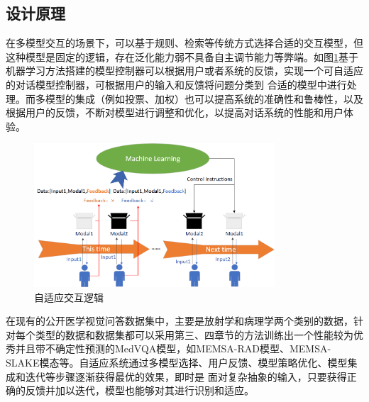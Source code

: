 \subsection{设计原理}
在多模型交互的场景下，可以基于规则、检索等传统方式选择合适的交互模型，但这种模型是固定的逻辑，存在泛化能力弱不具备自主调节能力等弊端。如图\ref{comu_logit}基于机器学习方法搭建的模型控制器可以根据用户或者系统的反馈，实现一个可自适应的对话模型控制器，可根据用户的输入和反馈将问题分类到
合适的模型中进行处理。而多模型的集成（例如投票、加权）也可以提高系统的准确性和鲁棒性，以及根据用户的反馈，不断对模型进行调整和优化，以提高对话系统的性能和用户体验。

\begin{figure}[htbp]
	\centering	
	\includegraphics[width=0.8\textwidth]{Fig/myfig/chapter5/comu_logit.png}  %
	\caption{\label{comu_logit}自适应交互逻辑} 
\end{figure}

在现有的公开医学视觉问答数据集中，主要是放射学和病理学两个类别的数据，针对每个类型的数据和数据集都可以采用第三、四章节的方法训练出一个性能较为优秀并且带不确定性预测的MedVQA模型，如MEMSA-RAD模型、MEMSA-SLAKE模态等。自适应系统通过多模型选择、用户反馈、模型策略优化、模型集成和迭代等步骤逐渐获得最优的效果，即时是
面对复杂抽象的输入，只要获得正确的反馈并加以迭代，模型也能够对其进行识别和适应。

